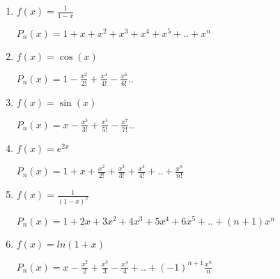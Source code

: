 \documentclass[../practica_05.tex]{subfiles}
\begin{document}
    \begin{enumerate}
        \item $f(x) = \frac{1}{1-x}$
        
            $P_n(x) = 1 + x + x^2 + x^3 + x^4 + x^5 + .. + x^n $
            
        \item $f(x) = \cos(x)$

            $P_n(x) = 1 - \frac{x^2}{2!} + \frac{x^4}{4!} - \frac{x^6}{6!} ..$
            
        \item $f(x) = \sin(x)$
    
            $P_n(x) = x - \frac{x^3}{3!} + \frac{x^5}{5!} - \frac{x^7}{7!} ..$
            
        \item $f(x) = e^{2x}$

            $P_n(x) = 1 + x + \frac{x^2}{2!} + \frac{x^3}{3!} + \frac{x^4}{4!} + .. + \frac{x^n}{n!}$

        \item $f(x) = \frac{1}{(1-x)^2}$

            $P_n(x) = 1 + 2x + 3x^2 + 4x^3 + 5x^4 + 6x^5 + .. + (n+1)x^n $
            
        \item $f(x) = ln(1+x)$

            $P_n(x) = x - \frac{x^2}{2} + \frac{x^3}{3} - \frac{x^4}{4} +  .. + (-1)^{n+1}\frac{x^n}{n} $

    \end{enumerate}
\end{document}
